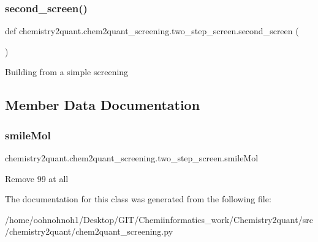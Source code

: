 \subsubsection{\texorpdfstring{second\+\_\+screen()}{second\_screen()}}
{\footnotesize\ttfamily def chemistry2quant.\+chem2quant\+\_\+screening.\+two\+\_\+step\+\_\+screen.\+second\+\_\+screen (\begin{DoxyParamCaption}{ }\end{DoxyParamCaption})}

\begin{DoxyVerb}Building from a simple screening
\end{DoxyVerb}


\subsection{Member Data Documentation}
\mbox{\label{classchemistry2quant_1_1chem2quant__screening_1_1two__step__screen_a6fde4c5a06a5d83ff1bad48186131072}}
\subsubsection{\texorpdfstring{smile\+Mol}{smileMol}}
{\footnotesize\ttfamily chemistry2quant.\+chem2quant\+\_\+screening.\+two\+\_\+step\+\_\+screen.\+smile\+Mol}

\begin{DoxyVerb}Remove 99%
at all
\end{DoxyVerb}


The documentation for this class was generated from the following file\+:\begin{DoxyCompactItemize}
\item
/home/oohnohnoh1/\+Desktop/\+G\+I\+T/\+Chemiinformatics\+\_\+work/\+Chemistry2quant/src/chemistry2quant/chem2quant\+\_\+screening.\+py\end{DoxyCompactItemize}
